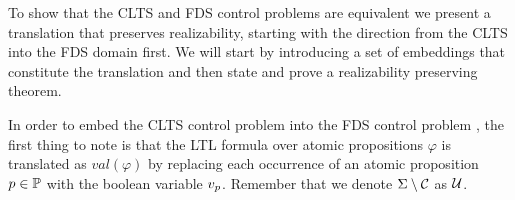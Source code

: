 
To show that the CLTS and FDS control problems are equivalent we  present a translation that preserves realizability, starting with the direction from the CLTS into the FDS domain first. We will start by introducing a set of embeddings that constitute the translation and then state and prove a realizability preserving theorem.


In order to embed the CLTS control problem \controlProblemDef into the FDS control problem \fdsEmbeddingDef, the first thing to note is that the LTL formula over atomic propositions $\varphi$ is translated as $val(\varphi)$ by replacing each occurrence of an atomic proposition $p \in \mathbb{P}$ with the boolean variable $v_{p}$. Remember that we denote $\Sigma \setminus \mathcal{C}$ as $\mathcal{U}$. 
%	

